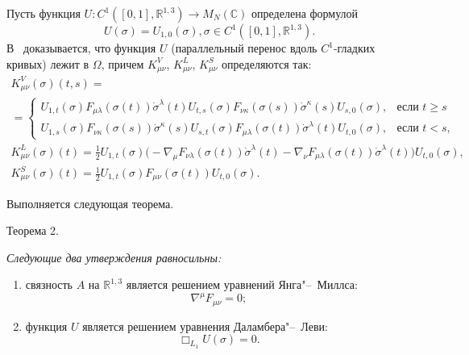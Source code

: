 Пусть функция $U\colon C^1([0, 1],\mathbb{R}^{1,3})\to M_N(\mathbb{C})$ определена формулой 
$$U(\sigma)=U_{1, 0}(\sigma), \sigma \in C^1([0, 1],\mathbb{R}^{1, 3}).$$
В~\cite{volkov:bib:AGV} доказывается, что функция $U$%
(параллельный перенос вдоль $C^1$-гладких кривых)
 лежит в $\Omega$, причем $K^V_{\mu\nu}$, $K^L_{\mu\nu}$, $K^S_{\mu\nu}$ определяются так:
\begin{multline}
\label{volk:KV}
K^V_{\mu\nu}(\sigma)(t,s)=\\=\begin{cases}
U_{1,t}(\sigma)F_{\mu\lambda}(\sigma(t))\dot{\sigma}^\lambda(t)U_{t,s}(\sigma)F_{\nu\kappa}(\sigma(s))\dot{\sigma}^\kappa(s)U_{s, 0}(\sigma),&\text{если $t\geq s$}\\
U_{1,s}(\sigma)F_{\nu\kappa}(\sigma(s))\dot{\sigma}^\kappa(s)U_{s,t}(\sigma)F_{\mu\lambda}(\sigma(t))\dot{\sigma}^\lambda(t)U_{t, 0}(\sigma)
,&\text{если $t<s$},
\end{cases}
\end{multline}
\begin{gather}
\label{volk:KL}
K^L_{\mu\nu}(\sigma)(t)=\frac 12U_{1,t}(\sigma)
\bigl(-\nabla_\mu F_{\nu\lambda}(\sigma(t))\dot{\sigma}^\lambda(t)-\nabla_\nu F_{\mu\lambda}(\sigma(t))\dot{\sigma}^\lambda(t) \bigr)U_{t, 0}(\sigma),
\\
\label{volk:KS}
K^S_{\mu\nu}(\sigma)(t)=\frac 12U_{1,t}(\sigma) F_{\mu\nu}(\sigma(t))U_{t, 0}(\sigma).
\end{gather}

Выполняется следующая теорема.

\smallskip

\hypertarget{volk:th2}{}

{\small\sc Теорема 2.} {\it
Следующие два утверждения равносильны{\/\rm:}
\begin{enumerate}
\item[\rm 1)]  связность $A$ на $\mathbb{R}^{1,3}$ является решением уравнений Янга"--~Миллса{\/\rm:}
\begin{equation}
\label{volk:form_350}
 \nabla^\mu F_{\mu\nu}=0;
\end{equation}
\item[\rm 2)] функция $U$
является решением уравнения Даламбера"--~Леви{\/\rm:}
\begin{equation}
\label{volk:form 360}
 \Box_{L_1} U(\sigma)=0.
\end{equation}
\end{enumerate}
}
\smallskip

